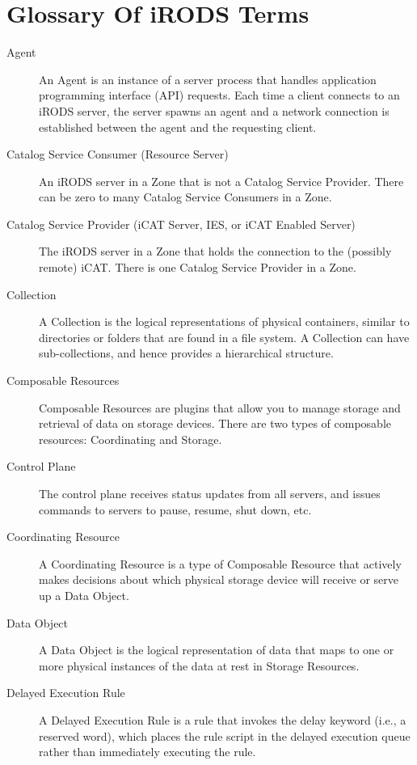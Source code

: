 \documentclass[10pt,oneside]{memoir}
\begin{document}
\chapter{Glossary Of iRODS Terms}

\begin{description}

\item [Agent]
An Agent is an instance of a server process that handles application programming interface (API) requests. Each time a client connects to an iRODS server, the server spawns an agent and a network connection is established between the agent and the requesting client.

\item [Catalog Service Consumer (Resource Server)]
An iRODS server in a Zone that is not a Catalog Service Provider.  There can be zero to many Catalog Service Consumers in a Zone.

\item [Catalog Service Provider (iCAT Server, IES, or iCAT Enabled Server)]
The iRODS server in a Zone that holds the connection to the (possibly remote) iCAT. There is one Catalog Service Provider in a Zone.

\item [Collection]
A Collection is the logical representations of physical containers, similar to directories or folders that are found in a file system. A Collection can have sub-collections, and hence provides a hierarchical structure.

\item [Composable Resources]
Composable Resources are plugins that allow you to manage storage and retrieval of data on storage devices. There are two types of composable resources: Coordinating and Storage.

\item [Control Plane]
The control plane receives status updates from all servers, and issues commands to servers to pause, resume, shut down, etc.

\item [Coordinating Resource]
A Coordinating Resource is a type of Composable Resource that actively makes decisions about which physical storage device will receive or serve up a Data Object.

\item [Data Object]
A Data Object is the logical representation of data that maps to one or more physical instances of the data at rest in Storage Resources.

\item [Delayed Execution Rule]
A Delayed Execution Rule is a rule that invokes the delay keyword (i.e., a reserved word), which places the rule script in the delayed execution queue rather than immediately executing the rule.


\end{description}
\end{document}
